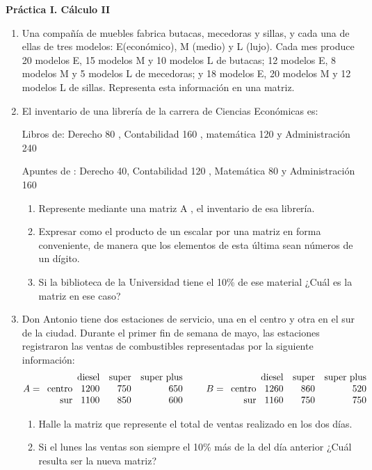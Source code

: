 \documentclass[12pt]{article}
\begin{document}
\begin{center}
    {\Large \bf Práctica I. Cálculo II}
\end{center}

\begin{enumerate}
  \item Una compañía de muebles fabrica butacas, mecedoras y sillas, y cada una de ellas de tres modelos: E(económico), M (medio) y L (lujo). Cada mes produce 20 modelos E, 15 modelos M y 10 modelos L de butacas; 12 modelos E, 8 modelos M y 5 modelos L de mecedoras; y 18 modelos E, 20 modelos M y 12 modelos L de sillas. Representa esta información en una matriz.
  \item El inventario de una librería de la carrera de Ciencias Económicas es:

Libros de: Derecho 80 , Contabilidad 160 , matemática 120 y Administración 240

Apuntes de : Derecho 40, Contabilidad 120 , Matemática 80 y Administración 160
\begin{enumerate}
  \item Represente mediante una matriz A , el inventario de esa librería.
  \item Expresar como el producto de un escalar por una matriz en forma conveniente, de manera que los elementos de esta última sean números de un dígito.
  \item Si la biblioteca de la Universidad tiene el 10\% de ese material ¿Cuál es la matriz en ese caso?
\end{enumerate}
\item Don Antonio tiene dos estaciones de servicio, una en el centro y otra en el sur de la ciudad. Durante el primer fin de semana de mayo, las estaciones registraron las ventas de combustibles representadas por la siguiente información:
\[
A =
\begin{array}{r@{\hspace{0.5em}}r r r} %
\multicolumn{1}{c}{} & \text{diesel} & \text{super} & \text{super plus} \\ %
\text{centro} & 1200 & 750 & 650 \\
\text{sur} & 1100 & 850 & 600
\end{array}
\qquad
B =
\begin{array}{r@{\hspace{0.5em}}r r r} %
\multicolumn{1}{c}{} & \text{diesel} & \text{super} & \text{super plus} \\ %
\text{centro} & 1260 & 860 & 520 \\
\text{sur} & 1160 & 750 & 750
\end{array}
\]
\begin{enumerate}
  \item Halle la matriz que represente el total de ventas realizado en los dos días.
  \item Si el lunes las ventas son siempre el 10\% más de la del día anterior ¿Cuál resulta ser la nueva matriz?
\end{enumerate}


\end{enumerate}
\end{document}
